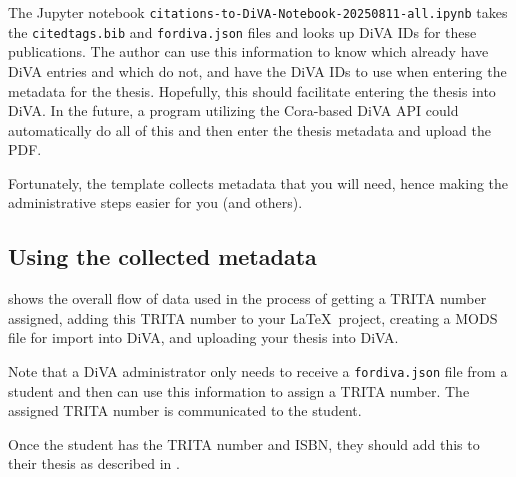 \documentclass[12pt, twoside]{article}
\newcommand{\fname}[1]{\texttt{#1}}
\begin{document}
\begin{enumerate}
    The Jupyter notebook \fname{citations-to-DiVA-Notebook-20250811-all.ipynb} takes the \fname{citedtags.bib} and \fname{fordiva.json} files and looks up DiVA IDs for these publications. The author can use this information to \first know which already have DiVA entries and which do not, and \Second have the DiVA IDs to use when entering the metadata for the thesis. Hopefully, this should facilitate entering the thesis into \gls{DiVA}. In the future, a program utilizing the Cora-based DiVA \gls{API} could automatically do all of this and then enter the thesis metadata and upload the PDF.
\end{enumerate}

Fortunately, the template collects metadata that you will need, hence making the administrative steps easier for you (and others). 

\subsection{Using the collected metadata}
 shows the overall flow of data used in the process of getting a TRITA number assigned, adding this TRITA number to your \LaTeX{}~project, creating a \gls{MODS} file for import into \gls{DiVA}, and uploading your thesis into \gls{DiVA}. 

Note that a \gls{DiVA} administrator only needs to receive a \fname{fordiva.json} file from a student and then can use this information to assign a TRITA number. The assigned TRITA number is communicated to the student.

Once the student has the TRITA number and \gls{ISBN}, they should add this to their thesis as described in .

\end{document}
